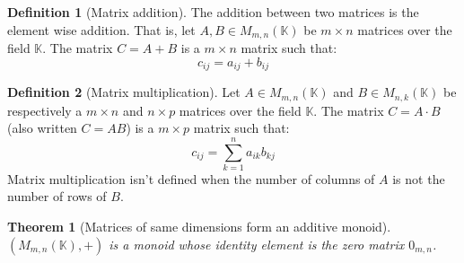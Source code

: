 \documentclass{article}
\newtheorem{theorem}{Theorem}[section]
\theoremstyle{definition}
\newtheorem{definition}{Definition}[section]
\theoremstyle{remark}
\theoremstyle{example}
\begin{document}
\begin{definition}[Matrix addition]
    The addition between two matrices is the element wise addition. That is, let $A, B \in M_{m, n}(\mathbb{K})$ be $m \times n$ matrices over the field $\mathbb{K}$. The matrix $C = A + B$ is a $m \times n$ matrix such that:
        $$c_{ij} = a_{ij} + b_{ij}$$
\end{definition}

\begin{definition}[Matrix multiplication]
		Let $A \in M_{m,n}(\mathbb{K})$ and $B \in M_{n,k}(\mathbb{K})$ be respectively a $m \times n$ and $n \times p$ matrices over the field $\mathbb{K}$. The matrix $C = A \cdot B$ (also written $C = AB$) is a $m \times p$ matrix such that:
        $$c_{ij} = \sum_{k=1}^n a_{ik} b_{kj}$$
    Matrix multiplication isn't defined when the number of columns of $A$ is not the number of rows of $B$.
\end{definition}

\begin{theorem}[Matrices of same dimensions form an additive monoid]
		$(M_{m,n}(\mathbb{K}), +)$ is a monoid whose identity element is the zero matrix $0_{m,n}$.
\end{theorem}
\end{document}
